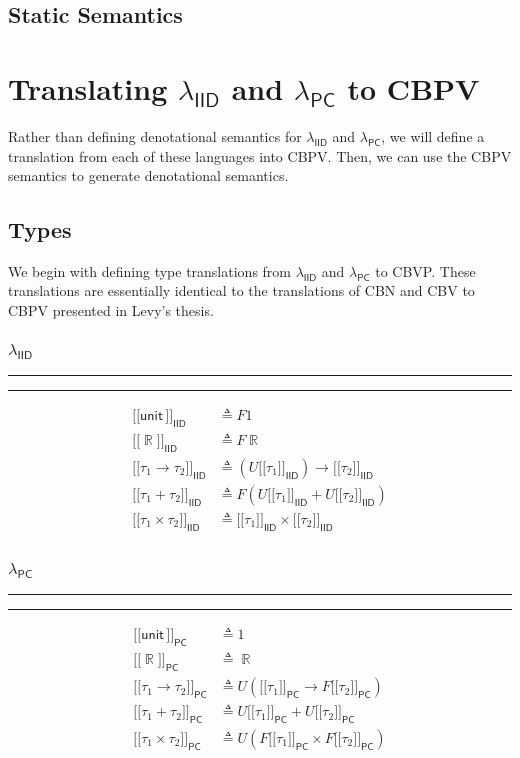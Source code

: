 \documentclass{article}
\DeclareMathOperator*\R{\mathbb{R}}
\newcommand{\iid}{\mathsf{IID}}
\newcommand{\pc}{\mathsf{PC}}
\newcommand{\unit}{\mathsf{unit\,}}
\newcommand{\1}{\mathsf{\,\#1\,}}
\newcommand{\2}{\mathsf{\,\#2\,}}
\newcommand{\semiid}[1]{[\![ #1 {]\!]}_{\mathsf{IID}}}
\newcommand{\sempc}[1]{[\![ #1 {]\!]}_{\mathsf{PC}}}
\begin{document}
\subsection{Static Semantics}

\newpage
\section{Translating $\lambda_{\iid}$ and $\lambda_{\pc}$ to CBPV}
Rather than defining denotational semantics for $\lambda_{\iid}$ and $\lambda_{\pc}$,
we will define a translation from each of these languages into CBPV.
Then, we can use the CBPV semantics to generate denotational semantics.

\subsection{Types}
We begin with defining type translations from $\lambda_{\iid}$ and $\lambda_{\pc}$ to CBVP.
These translations are essentially identical to the translations of CBN and CBV to CBPV presented in Levy's thesis.


\begin{multicols}{2}
\subsubsection*{$\lambda_\iid$}
\hrule\hrule
\medskip
	\begin{equation*}
		\begin{split}
			\semiid{\unit} &\triangleq F 1 \\
			\semiid{\R} &\triangleq F \R \\
			\semiid{\tau_1 \to \tau_2} &\triangleq (U \semiid{\tau_1}) \to \semiid{\tau_2} \\
			\semiid{\tau_1 + \tau_2} &\triangleq F(U \semiid{\tau_1} + U \semiid{\tau_2}) \\
			\semiid{\tau_1 \times \tau_2} &\triangleq \semiid{\tau_1} \times \semiid{\tau_2} \\
		\end{split}
	\end{equation*}
		
\subsubsection*{$\lambda_\pc$}
\hrule\hrule
\medskip
	\begin{equation*}
		\begin{split}
			\sempc{\unit} &\triangleq 1 \\
			\sempc{\R} &\triangleq \R \\
			\sempc{\tau_1 \to \tau_2} &\triangleq U (\sempc{\tau_1} \to F\sempc{\tau_2}) \\
			\sempc{\tau_1 + \tau_2} &\triangleq U\sempc{\tau_1} + U\sempc{\tau_2} \\
			\sempc{\tau_1 \times \tau_2} &\triangleq U(F\sempc{\tau_1} \times F\sempc{\tau_2}) \\
		\end{split}
	\end{equation*}
\end{multicols}
\end{document}
